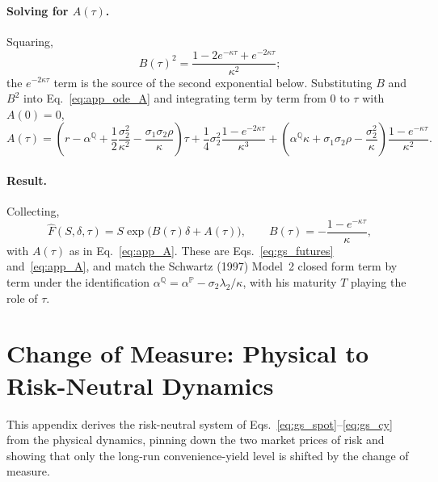 \documentclass[11pt, a4paper]{article}
\newcommand{\convyield}{\delta}             %
\newcommand{\meanrev}{\kappa}               %
\newcommand{\longrun}{\alpha}               %
\begin{document}
\paragraph{Solving for $A(\tau)$.} Squaring,
\begin{equation}
  \label{eq:app_Bsq}
  B(\tau)^2 = \frac{1 - 2e^{-\meanrev\tau} + e^{-2\meanrev\tau}}{\meanrev^2};
\end{equation}
\noindent
the $e^{-2\meanrev\tau}$ term is the source of the second exponential below. Substituting $B$ and $B^2$ into Eq.~\ref{eq:app_ode_A} and integrating term by term from $0$ to $\tau$ with $A(0) = 0$,
\begin{equation}
  \label{eq:app_A}
  A(\tau) = \left(r - \longrun^{\mathbb{Q}} + \frac{1}{2}\frac{\sigma_2^2}{\meanrev^2} - \frac{\sigma_1\sigma_2\rho}{\meanrev}\right)\tau
  + \frac{1}{4}\sigma_2^2\frac{1 - e^{-2\meanrev\tau}}{\meanrev^3}
  + \left(\longrun^{\mathbb{Q}}\meanrev + \sigma_1\sigma_2\rho - \frac{\sigma_2^2}{\meanrev}\right)\frac{1 - e^{-\meanrev\tau}}{\meanrev^2}.
\end{equation}

\paragraph{Result.} Collecting,
\begin{equation}
  \label{eq:app_result}
  \hat{F}(S, \convyield, \tau) = S\exp\!\big(B(\tau)\convyield + A(\tau)\big),
  \qquad
  B(\tau) = -\frac{1 - e^{-\meanrev\tau}}{\meanrev},
\end{equation}
\noindent
with $A(\tau)$ as in Eq.~\ref{eq:app_A}. These are Eqs.~\ref{eq:gs_futures} and~\ref{eq:app_A}, and match the Schwartz (1997) Model~2 closed form term by term under the identification $\longrun^{\mathbb{Q}} = \longrun^{\mathbb{P}} - \sigma_2\lambda_2/\meanrev$, with his maturity $T$ playing the role of $\tau$.



\section{Change of Measure: Physical to Risk-Neutral Dynamics}
\label{app:gs_derivation}

This appendix derives the risk-neutral system of Eqs.~\ref{eq:gs_spot}--\ref{eq:gs_cy} from the physical dynamics, pinning down the two market prices of risk and showing that only the long-run convenience-yield level is shifted by the change of measure.
\end{document}
